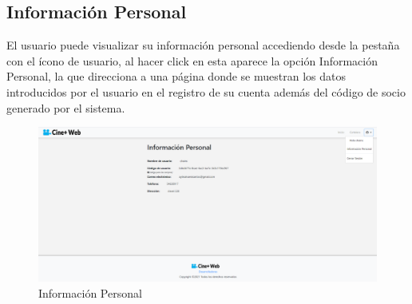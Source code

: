 \subsection{Informaci\'on Personal}
El usuario puede visualizar su informaci\'on personal accediendo desde la pesta\~na con el \'icono de usuario, al hacer click en esta aparece la opci\'on Informaci\'on Personal, la que direcciona a una p\'agina donde se muestran los datos introducidos por el usuario en el registro de su cuenta adem\'as del c\'odigo de socio generado por el sistema.

\begin{figure}[h!]
	\centering
	\includegraphics[scale=0.35]{./chapters/img/personal_info.png}
	
	\label{fig:personal_info}
	\caption{Informaci\'on Personal}
	
\end{figure}